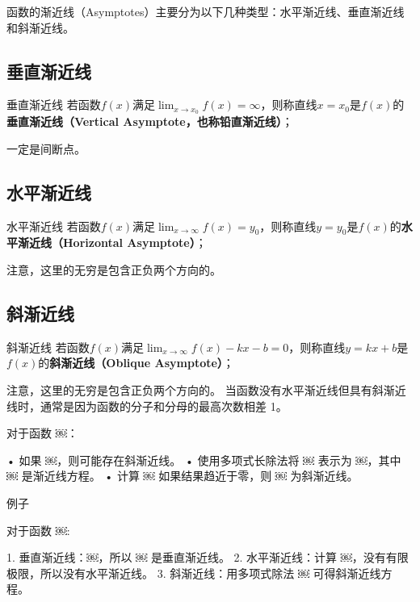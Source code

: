 
函数的渐近线（Asymptotes）主要分为以下几种类型：水平渐近线、垂直渐近线和斜渐近线。



\subsection{垂直渐近线}

\begin{definition}{垂直渐近线}
若函数$f(x)$满足$\displaystyle \lim_{x\to x_0}f(x)=\infty$，则称直线$x=x_0$是$f(x)$的\textbf{垂直渐近线（Vertical Asymptote，也称铅直渐近线）}；
\end{definition}
一定是间断点。

\subsection{水平渐近线}

\begin{definition}{水平渐近线}
若函数$f(x)$满足$\displaystyle \lim_{x\to \infty}f(x)=y_0$，则称直线$y=y_0$是$f(x)$的\textbf{水平渐近线（Horizontal Asymptote）}；
\end{definition}

注意，这里的无穷是包含正负两个方向的。


\subsection{斜渐近线}

\begin{definition}{斜渐近线}
若函数$f(x)$满足$\displaystyle \lim_{x\to \infty}f(x)-kx-b=0$，则称直线$y=kx+b$是$f(x)$的\textbf{斜渐近线（Oblique Asymptote）}；
\end{definition}
注意，这里的无穷是包含正负两个方向的。
当函数没有水平渐近线但具有斜渐近线时，通常是因为函数的分子和分母的最高次数相差 1。

对于函数 ￼：

	•	如果 ￼，则可能存在斜渐近线。
	•	使用多项式长除法将 ￼ 表示为 ￼，其中 ￼ 是渐近线方程。
	•	计算 ￼ 如果结果趋近于零，则 ￼ 为斜渐近线。

例子

对于函数 ￼:

	1.	垂直渐近线：￼，所以 ￼ 是垂直渐近线。
	2.	水平渐近线：计算 ￼，没有有限极限，所以没有水平渐近线。
	3.	斜渐近线：用多项式除法 ￼ 可得斜渐近线方程。

